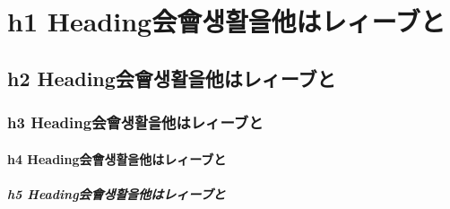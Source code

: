 \documentclass[
  paper=a4,
  ,captions=tableheading
]{scrartcl}
\begin{document}




{
\hypersetup{linkcolor=}
\setcounter{tocdepth}{5}
\tableofcontents


\thispagestyle{empty}
\newpage
\setcounter{page}{1}
}

\hypertarget{h1-headingux4f1aux6703uxc0dduxd65cuxc744ux4ed6ux306fux30ecux30a3ux30fcux30d6ux3068}{%
\section{h1
Heading会會생활을他はレィーブと}\label{h1-headingux4f1aux6703uxc0dduxd65cuxc744ux4ed6ux306fux30ecux30a3ux30fcux30d6ux3068}}

\hypertarget{h2-headingux4f1aux6703uxc0dduxd65cuxc744ux4ed6ux306fux30ecux30a3ux30fcux30d6ux3068}{%
\subsection{h2
Heading会會생활을他はレィーブと}\label{h2-headingux4f1aux6703uxc0dduxd65cuxc744ux4ed6ux306fux30ecux30a3ux30fcux30d6ux3068}}

\hypertarget{h3-headingux4f1aux6703uxc0dduxd65cuxc744ux4ed6ux306fux30ecux30a3ux30fcux30d6ux3068}{%
\subsubsection{h3
Heading会會생활을他はレィーブと}\label{h3-headingux4f1aux6703uxc0dduxd65cuxc744ux4ed6ux306fux30ecux30a3ux30fcux30d6ux3068}}

\hypertarget{h4-headingux4f1aux6703uxc0dduxd65cuxc744ux4ed6ux306fux30ecux30a3ux30fcux30d6ux3068}{%
\paragraph{h4
Heading会會생활을他はレィーブと}\label{h4-headingux4f1aux6703uxc0dduxd65cuxc744ux4ed6ux306fux30ecux30a3ux30fcux30d6ux3068}}

\hypertarget{h5-headingux4f1aux6703uxc0dduxd65cuxc744ux4ed6ux306fux30ecux30a3ux30fcux30d6ux3068}{%
\subparagraph{h5
Heading会會생활을他はレィーブと}\label{h5-headingux4f1aux6703uxc0dduxd65cuxc744ux4ed6ux306fux30ecux30a3ux30fcux30d6ux3068}}
\end{document}
